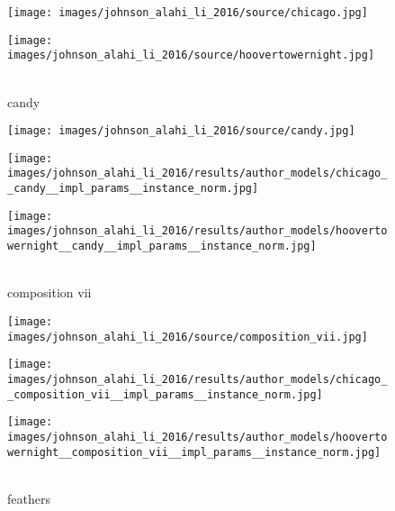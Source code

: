 \begin{figure}[H]
	\begin{minipage}[t]{0.3\textwidth}
		\centering
		\hfill
	\end{minipage}
	\hfill%
	\begin{minipage}[t]{0.3\textwidth}
		\centering
		\texttt{[image: images/johnson\_alahi\_li\_2016/source/chicago.jpg]}
	\end{minipage}
	\hfill%
	\begin{minipage}[t]{0.3\textwidth}
		\centering
		\texttt{[image: images/johnson\_alahi\_li\_2016/source/hoovertowernight.jpg]}
	\end{minipage}
	\hfill \\ candy \hfill \\
	\begin{minipage}[t]{0.3\textwidth}
		\centering
		\texttt{[image: images/johnson\_alahi\_li\_2016/source/candy.jpg]}
	\end{minipage}
	\hfill%
	\begin{minipage}[t]{0.3\textwidth}
		\centering
		\texttt{[image: images/johnson\_alahi\_li\_2016/results/author\_models/chicago\_\_candy\_\_impl\_params\_\_instance\_norm.jpg]}
	\end{minipage}
	\hfill%
	\begin{minipage}[t]{0.3\textwidth}
		\centering
		\texttt{[image: images/johnson\_alahi\_li\_2016/results/author\_models/hoovertowernight\_\_candy\_\_impl\_params\_\_instance\_norm.jpg]}
	\end{minipage}
	\hfill \\ composition vii \hfill \\
	\begin{minipage}[t]{0.3\textwidth}
		\centering
		\texttt{[image: images/johnson\_alahi\_li\_2016/source/composition\_vii.jpg]}
	\end{minipage}
	\hfill%
	\begin{minipage}[t]{0.3\textwidth}
		\centering
		\texttt{[image: images/johnson\_alahi\_li\_2016/results/author\_models/chicago\_\_composition\_vii\_\_impl\_params\_\_instance\_norm.jpg]}
	\end{minipage}
	\hfill%
	\begin{minipage}[t]{0.3\textwidth}
		\centering
		\texttt{[image: images/johnson\_alahi\_li\_2016/results/author\_models/hoovertowernight\_\_composition\_vii\_\_impl\_params\_\_instance\_norm.jpg]}
	\end{minipage}
	\hfill \\ feathers \hfill \\

\end{figure}
